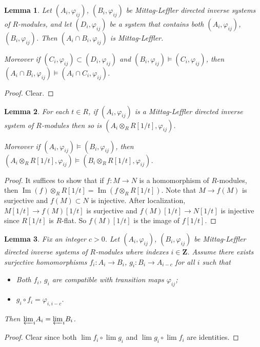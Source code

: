 \documentclass[11pt]{amsart}
\newtheorem{lem}{Lemma}
\numberwithin{thm}{section}
\numberwithin{lem}{section}
\numberwithin{cor}{section}
\numberwithin{prop}{section}
\numberwithin{exam}{section}
\numberwithin{dfn}{section}
\newcommand{\Img}{\operatorname{Im}}
\newcommand{\invlim}[1]{{\varprojlim_{#1}}}
\newcommand{\Z}{\mathbf{Z}}
\begin{document}
\begin{appendices}
\begin{lem}
Let $(A_i, \varphi_{ij})$, $(B_i, \varphi_{ij})$ be
Mittag-Leffler directed inverse systems of $R$-modules,
and let $(D_i, \varphi_{ij})$ be a system that contains both
$(A_i, \varphi_{ij})$, $(B_i, \varphi_{ij})$.
Then $(A_i \cap B_i, \varphi_{ij})$ is Mittag-Leffler.

Moreover if $(C_i, \varphi_{ij})\subset (D_i, \varphi_{ij})$
and $(B_i, \varphi_{ij})\models (C_i, \varphi_{ij})$,
then
 $(A_i\cap B_i, \varphi_{ij})\models (A_i\cap C_i, \varphi_{ij})$.
\end{lem}

\begin{proof}
Clear.
\end{proof}

\begin{lem}
For each $t\in R$,
if $(A_i, \varphi_{ij})$ is a
Mittag-Leffler directed inverse system of $R$-modules
then so is $(A_i\otimes_RR[1/t], \varphi_{ij})$.

Moreover if $(A_i, \varphi_{ij})\models (B_i, \varphi_{ij})$,
then
 $(A_i\otimes_RR[1/t], \varphi_{ij})\models (B_i\otimes_RR[1/t], \varphi_{ij})$.
\end{lem}

\begin{proof}
It suffices to show that
if $f:M\to N$ is a homomorphism of $R$-modules,
then $\Img(f)\otimes_R R[1/t] = \Img(f\otimes_R R[1/t])$.
Note that $M\to f(M)$ is surjective and $f(M)\subset N$ is injective.
After localization, $M[1/t]\to f(M)[1/t]$ is surjective
and $f(M)[1/t]\to N[1/t]$ is injective since $R[1/t]$ is $R$-flat.
So $f(M)[1/t]$ is the image of $f[1/t]$.
\end{proof}

\begin{lem}
Fix an integer $c>0$.
Let $(A_i, \varphi_{ij})$, $(B_i, \varphi_{ij})$ be
Mittag-Leffler directed inverse systems of $R$-modules
where indexes $i\in \Z$.
Assume there exists surjective homomorphisms
$f_i: A_i\to B_i$, $g_i: B_i\to A_{i-c}$
for all $i$ such that
\begin{itemize}
\item Both $f_i$, $g_i$ are compatible with transition maps $\varphi_{ij}$;
\item $g_i\circ f_i = \varphi_{i,i-c}$.
\end{itemize}
Then $\invlim{i} A_i = \invlim{i} B_i$.
\end{lem}

\begin{proof}
Clear since both $\lim f_i \circ \lim g_i$
and $\lim g_i \circ \lim f_i$ are identities.
\end{proof}


\end{appendices}
\end{document}
